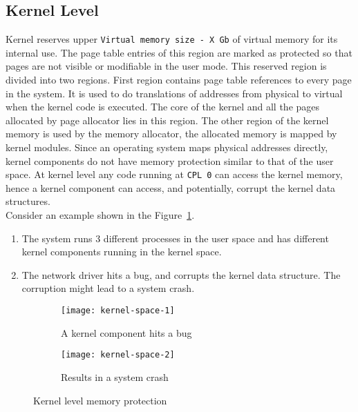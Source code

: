 \subsection{Kernel Level}
\label{subsec:kernel level}
Kernel reserves upper \texttt{Virtual memory size - X Gb} of virtual memory for its internal use. The page table entries of this region are marked as protected so that pages are not visible or modifiable in the user mode. This reserved region is divided into two regions. First region contains page table references to every page in the system. It is used to do translations of addresses from physical to virtual when the kernel code is executed. The core of the kernel and all the pages allocated by page allocator lies in this region. The other region of the kernel memory is used by the memory allocator, the allocated memory is mapped by kernel modules. Since an operating system maps physical addresses directly, kernel components do not have memory protection similar to that of the user space. At kernel level any code running at \texttt{CPL 0} can access the kernel memory, hence a kernel component can access, and potentially, corrupt the kernel data structures. 
\\[3mm]
Consider an example shown in the Figure~\ref{fig:Kernel space}.
\begin{enumerate}
\item The system runs 3 different processes in the user space and has different kernel components running in the kernel space.
\item The network driver hits a bug, and corrupts the kernel data structure. The corruption might lead to a system crash.
\end{enumerate}
\begin{figure}[!ht]
    \centering
    \begin{subfigure}[b]{0.49\textwidth}
	\texttt{[image: kernel-space-1]}
	\caption{A kernel component hits a bug}
    \end{subfigure}
	\hfill
    \begin{subfigure}[b]{0.49\textwidth}
	\texttt{[image: kernel-space-2]}
	\caption{Results in a system crash}
    \end{subfigure}
    \caption{Kernel level memory protection}\label{fig:Kernel space}
\end{figure}


